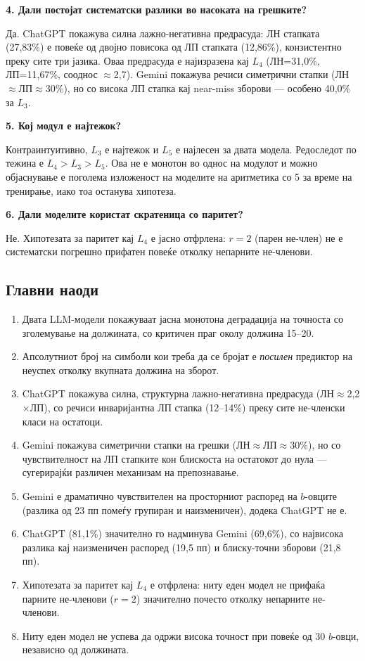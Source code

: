\documentclass[12pt,a4paper]{article}
\theoremstyle{definition}
\begin{document}
\textbf{4. Дали постојат систематски разлики во насоката на грешките?}

Да. ChatGPT покажува силна лажно-негативна предрасуда: ЛН стапката (27,83\%) е повеќе од двојно повисока од ЛП стапката (12,86\%), конзистентно преку сите три јазика. Оваа предрасуда е најизразена кај $L_4$ (ЛН=31,0\%, ЛП=11,67\%, сооднос $\approx$2,7). Gemini покажува речиси симетрични стапки (ЛН$\approx$ЛП$\approx$30\%), но со висока ЛП стапка кај near-miss зборови --- особено 40,0\% за $L_3$.

\textbf{5. Кој модул е најтежок?}

Контраинтуитивно, $L_3$ е најтежок и $L_5$ е најлесен за двата модела. Редоследот по тежина е $L_4 > L_3 > L_5$. Ова не е монотон во однос на модулот и можно објаснување е поголема изложеност на моделите на аритметика со 5 за време на тренирање, иако тоа останува хипотеза.

\textbf{6. Дали моделите користат скратеница со паритет?}

Не. Хипотезата за паритет кај $L_4$ е јасно отфрлена: $r=2$ (парен не-член) не е систематски погрешно прифатен повеќе отколку непарните не-членови.

\subsection{Главни наоди}

\begin{enumerate}
  \item Двата LLM-модели покажуваат јасна монотона деградација на точноста со зголемување на должината, со критичен праг околу должина 15--20.
  \item Апсолутниот број на симболи кои треба да се бројат е \textit{посилен} предиктор на неуспех отколку вкупната должина на зборот.
  \item ChatGPT покажува силна, структурна лажно-негативна предрасуда (ЛН$\approx$2,2$\times$ЛП), со речиси инваријантна ЛП стапка (12--14\%) преку сите не-членски класи на остатоци.
  \item Gemini покажува симетрични стапки на грешки (ЛН$\approx$ЛП$\approx$30\%), но со чувствителност на ЛП стапките кон блискоста на остатокот до нула --- сугерирајќи различен механизам на препознавање.
  \item Gemini е драматично чувствителен на просторниот распоред на $b$-овците (разлика од 23 пп помеѓу групиран и наизменичен), додека ChatGPT не е.
  \item ChatGPT (81,1\%) значително го надминува Gemini (69,6\%), со највисока разлика кај наизменичен распоред (19,5 пп) и блиску-точни зборови (21,8 пп).
  \item Хипотезата за паритет кај $L_4$ е отфрлена: ниту еден модел не прифаќа парните не-членови ($r=2$) значително почесто отколку непарните не-членови.
  \item Ниту еден модел не успева да одржи висока точност при повеќе од 30 $b$-овци, независно од должината.
\end{enumerate}
\end{document}
